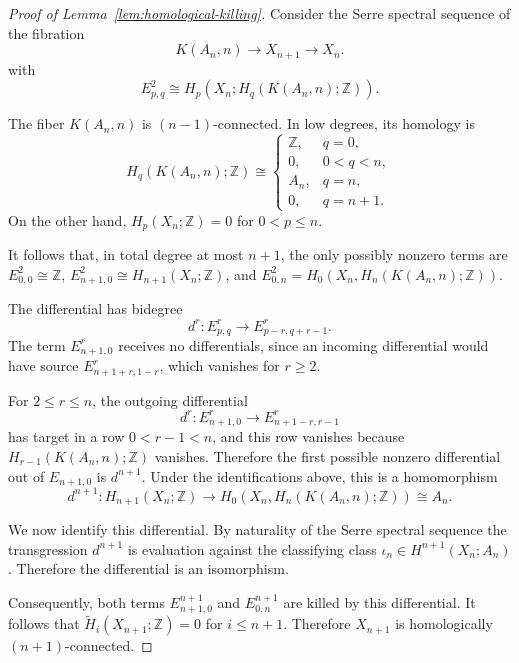 \documentclass[10pt,a4paper]{amsart}
\begin{document}
\begin{proof}[Proof of Lemma~\ref{lem:homological-killing}]
Consider the Serre spectral sequence of the fibration
\begin{equation}
K(A_n,n)\longrightarrow X_{n+1}\longrightarrow X_n .
\end{equation} with
\begin{equation}
E^2_{p,q}\cong H_p(X_n;H_q(K(A_n,n);\mathbb Z)).
\end{equation}

The fiber $K(A_n,n)$ is $(n-1)$-connected. In low degrees, its homology is 
\begin{equation}
H_q(K(A_n,n);\mathbb Z)\cong
\begin{cases}
\mathbb Z, & q=0,\\
0, & 0<q<n,\\
A_n, & q=n,\\
0, & q=n+1.
\end{cases}
\end{equation} On the other hand, $H_p(X_n;\mathbb Z)=0$ for $0<p\leq n$.

It follows that, in total degree at most $n+1$, the only possibly nonzero terms are $E^2_{0,0}\cong \mathbb Z$, $E^2_{n+1,0}\cong H_{n+1}(X_n;\mathbb Z)$, and $E^2_{0,n}=H_0(X_n, H_n(K(A_n,n);\mathbb Z))$.

The differential has bidegree
\begin{equation}
d^r:E^r_{p,q}\longrightarrow E^r_{p-r,q+r-1}.
\end{equation}
The term $E^r_{n+1,0}$ receives no differentials, since an incoming differential would have source $E^r_{n+1+r,1-r}$, which vanishes for $r\geq 2$. 

For $2\leq r\leq n$, the outgoing differential
\begin{equation}
d^r:E^r_{n+1,0}\longrightarrow E^r_{n+1-r,r-1}
\end{equation}
has target in a row $0<r-1<n$, and this row vanishes because $H_{r-1}(K(A_n,n);\mathbb Z)$ vanishes. Therefore the first possible nonzero differential out of $E_{n+1,0}$ is $d^{n+1}.$
Under the identifications above, this is a homomorphism 
\begin{equation}
d^{n+1}:H_{n+1}(X_n;\mathbb Z)\to H_0(X_n, H_n(K(A_n,n);\mathbb Z))\cong A_n.
\end{equation}

We now identify this differential. By naturality of the Serre spectral sequence the transgression $d^{n+1}$ is evaluation against the classifying class $\iota_n\in H^{n+1}(X_n;A_n)$. Therefore the differential is an isomorphism.

Consequently, both terms $E^{n+1}_{n+1,0}$ and $E^{n+1}_{0,n}$ are killed by this differential. It follows that $\widetilde H_i(X_{n+1};\mathbb Z)=0$ for $i\leq n+1$. Therefore $X_{n+1}$ is homologically $(n+1)$-connected.
\end{proof}
\end{document}
